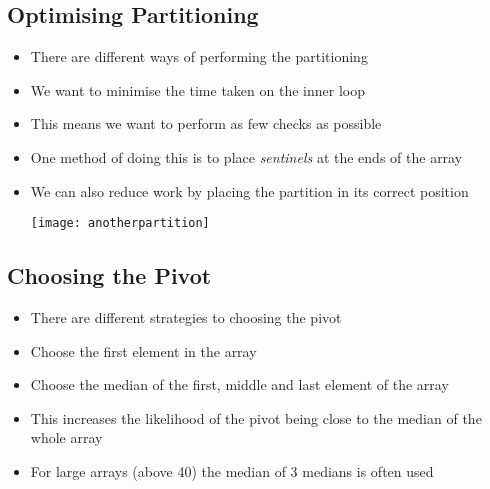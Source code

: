 
\begin{slide}
\section[-1]{Optimising Partitioning}

\begin{PauseHighLight}
  \begin{itemize}
  \item There are different ways of performing the partitioning\pause
  \item We want to minimise the time taken on the inner loop\pause
  \item This means we want to perform as few checks as possible\pause
  \item One method of doing this is to place \textit{sentinels} at the
  ends of the array\pause
  \item We can also reduce work by placing the partition in its correct
    position
  \begin{center}
    \texttt{[image: anotherpartition]}\pause
  \end{center}
  \end{itemize}
\end{PauseHighLight}

\end{slide}


\begin{slide}
\section{Choosing the Pivot}

\begin{PauseHighLight}
  \begin{itemize}
  \item There are different strategies to choosing the pivot\pause
  \item Choose the first element in the array\pause
  \item Choose the median of the first, middle and last element of the
    array\pause
  \item This increases the likelihood of the pivot being close to the
    median of the whole array\pause
  \item For large arrays (above 40) the median of 3 medians is often
    used\pause
  \end{itemize}
\end{PauseHighLight}

\end{slide}

